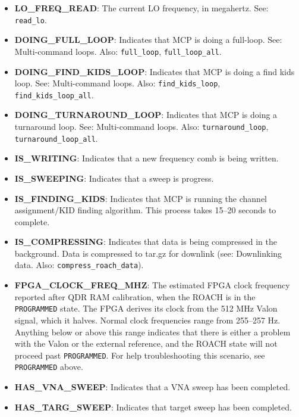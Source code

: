\begin{itemize}[leftmargin=*,label={}]
\item \textbf{LO\_FREQ\_READ}: The current LO frequency, in megahertz. See: \texttt{read\_lo}.

\item \textbf{DOING\_FULL\_LOOP}: Indicates that MCP is doing a full-loop. See: Multi-command loops. Also: \texttt{full\_loop}, \texttt{full\_loop\_all}.

\item \textbf{DOING\_FIND\_KIDS\_LOOP}: Indicates that MCP is doing a find kids loop. See: Multi-command loops. Also: \texttt{find\_kids\_loop}, \texttt{find\_kids\_loop\_all}.

\item \textbf{DOING\_TURNAROUND\_LOOP}: Indicates that MCP is doing a turnaround loop. See: Multi-command loops. Also: \texttt{turnaround\_loop}, \texttt{turnaround\_loop\_all}.

\item \textbf{IS\_WRITING}: Indicates that a new frequency comb is being written.

\item \textbf{IS\_SWEEPING}: Indicates that a sweep is progress.

\item \textbf{IS\_FINDING\_KIDS}: Indicates that MCP is running the channel assignment/KID finding algorithm. This process takes 15--20 seconds to complete.

\item \textbf{IS\_COMPRESSING}: Indicates that data is being compressed in the background. Data is compressed to tar.gz for downlink (see: Downlinking data. Also: \texttt{compress\_roach\_data}).

\item \textbf{FPGA\_CLOCK\_FREQ\_MHZ}: The estimated FPGA clock frequency reported after QDR RAM calibration, when the ROACH is in the \texttt{PROGRAMMED} state. The FPGA derives its clock from the 512 MHz Valon signal, which it halves. Normal clock frequencies range from 255--257 Hz. Anything below or above this range indicates that there is either a problem with the Valon or the external reference, and the ROACH state will not proceed past \texttt{PROGRAMMED}. For help troubleshooting this scenario, see \texttt{PROGRAMMED} above.

\item \textbf{HAS\_VNA\_SWEEP}: Indicates that a VNA sweep has been completed.

\item \textbf{HAS\_TARG\_SWEEP}: Indicates that target sweep has been completed.


\end{itemize}
